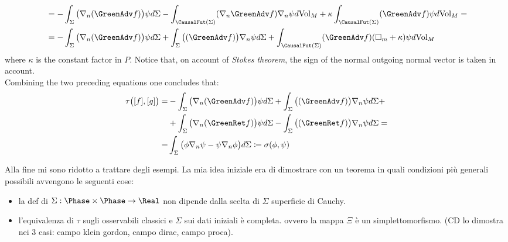 \documentclass[Main]{subfiles}
\begin{document}
\begin{example}
\begin{align}
			&= -\int_\Sigma \big( \nabla_n ( \GreenAdv f) \big) \psi d\Sigma 
				- \int_{\CausalFut(\Sigma)} (\nabla_n \GreenAdv f) \nabla_n \psi d\textrm{Vol}_M 
				+ \kappa \int_{\CausalFut(\Sigma)} ( \GreenAdv f) \psi d\textrm{Vol}_M  =\nonumber\\
			&= -\int_\Sigma \big( \nabla_n ( \GreenAdv f) \big) \psi d\Sigma 	+\int_\Sigma \big( ( \GreenAdv f) \big)\nabla_n  \psi d\Sigma  + \int_{\CausalFut(\Sigma)} ( \GreenAdv f) ( \square_m + \kappa) \psi d\textrm{Vol}_M
		\end{align}
		where $\kappa$ is the constant factor in $P$.
		Notice that, on account of \emph{Stokes theorem},  the sign of the normal outgoing normal vector is taken in account.\\
		Combining the two preceding equations one concludes that:
		\begin{align}
		\tau\big( [f], [g] \big) =&  -\int_\Sigma \big( \nabla_n ( \GreenAdv f) \big) \psi d\Sigma
		+\int_\Sigma \big( ( \GreenAdv f) \big)\nabla_n  \psi d\Sigma +\nonumber\\
		&+\int_\Sigma \big( \nabla_n ( \GreenRet f) \big) \psi d\Sigma  
		-\int_\Sigma \big( ( \GreenRet f) \big)\nabla_n  \psi d\Sigma =  \nonumber\\
		=& \int_\Sigma \big( \phi \nabla_n \psi - \psi \nabla_n \phi \big) d\Sigma \coloneqq\sigma (\phi, \psi)
		\end{align}
		
	\end{example}
	
\ifToninus
	\begin{Warning}
	Alla fine mi sono ridotto a trattare degli esempi. La mia idea iniziale era di dimostrare con un teorema in quali condizioni più generali possibili avvengono le seguenti cose:
	\begin{itemize}
		\item la def di $\Sigma: \Phase \times \Phase \rightarrow \Real$ non dipende dalla scelta di $\Sigma$ superficie di Cauchy.
		\item l'equivalenza di $\tau$ sugli osservabili classici e $\Sigma$  sui dati iniziali è completa. ovvero la mappa $\Xi$ è un simplettomorfismo. (CD lo dimostra nei 3 casi: campo klein gordon, campo dirac, campo proca).
	\end{itemize}
	\end{Warning}
\fi
\end{document}
